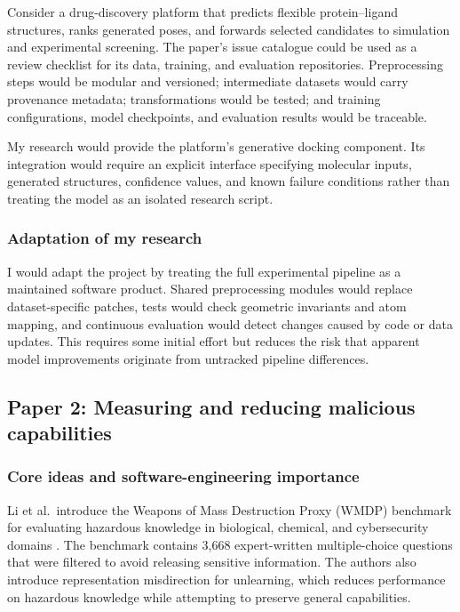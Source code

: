 \documentclass[a4paper,11pt]{article}
\begin{document}
Consider a drug-discovery platform that predicts flexible protein--ligand
structures, ranks generated poses, and forwards selected candidates to
simulation and experimental screening. The paper's issue catalogue could be
used as a review checklist for its data, training, and evaluation repositories.
Preprocessing steps would be modular and versioned; intermediate datasets would
carry provenance metadata; transformations would be tested; and training
configurations, model checkpoints, and evaluation results would be traceable.

My research would provide the platform's generative docking component. Its
integration would require an explicit interface specifying molecular inputs,
generated structures, confidence values, and known failure conditions rather
than treating the model as an isolated research script.

\subsubsection{Adaptation of my research}

I would adapt the project by treating the full experimental pipeline as a
maintained software product. Shared preprocessing modules would replace
dataset-specific patches, tests would check geometric invariants and atom
mapping, and continuous evaluation would detect changes caused by code or data
updates. This requires some initial effort but reduces the risk that apparent
model improvements originate from untracked pipeline differences.


\subsection{Paper 2: Measuring and reducing malicious capabilities}

\subsubsection{Core ideas and software-engineering importance}

Li et al.\ introduce the Weapons of Mass Destruction Proxy (WMDP) benchmark for evaluating hazardous knowledge in biological, chemical, and cybersecurity domains \cite{li2024wmdp}. The benchmark contains 3,668 expert-written multiple-choice questions that were filtered to avoid releasing sensitive information. The authors also introduce representation misdirection for unlearning, which reduces performance on hazardous knowledge while attempting to preserve general capabilities.
\end{document}
